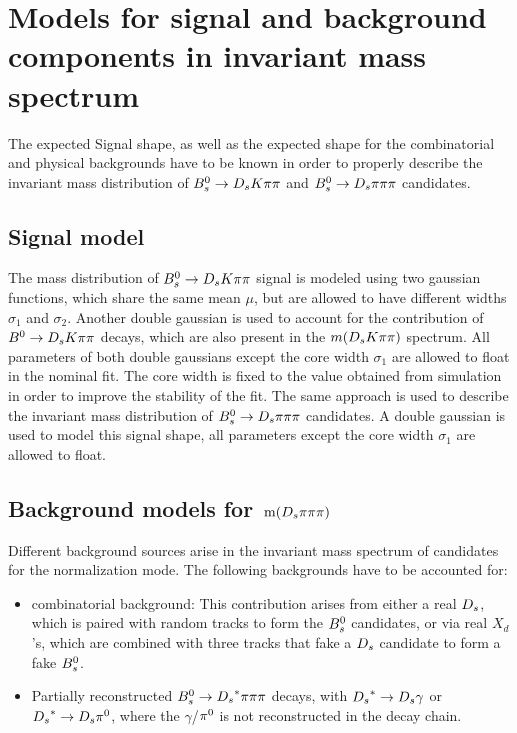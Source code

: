 \section{Models for signal and background components in invariant mass spectrum}
\label{sec: model}

The expected Signal shape, as well as the expected shape for the combinatorial and physical backgrounds have to be known in order to properly describe the invariant mass distribution of 
${{B}^0_{s}}\rightarrow{\ensuremath{{D}_{s}}}{\ensuremath{K}}{\ensuremath{\pi}}{\ensuremath{\pi}}$ and ${{B}^0_{s}}\rightarrow{\ensuremath{{D}_{s}}}{\ensuremath{\pi}}{\ensuremath{\pi}}{\ensuremath{\pi}}$ candidates.

\subsection{Signal model}
\label{subsec: signalmodel}
The mass distribution of ${{B}^0_{s}}\rightarrow{\ensuremath{{D}_{s}}}{\ensuremath{K}}{\ensuremath{\pi}}{\ensuremath{\pi}}$ signal is modeled using two gaussian functions, which share the same mean $\mu$, but are allowed to have different widths $\sigma_{1}$ and $\sigma_{2}$. 
Another double gaussian is used to account for the contribution of ${B}^{0}\rightarrow{\ensuremath{{D}_{s}}}{\ensuremath{K}}{\ensuremath{\pi}}{\ensuremath{\pi}}$ decays, which are also present in the $m({{D}_{s}}{K}{\pi}{\pi})$ spectrum. 
All parameters of both double gaussians except the core width $\sigma_{1}$ are allowed to float in the nominal fit. 
The core width is fixed to the value obtained from simulation in order to improve the stability of the fit. \newline
The same approach is used to describe the invariant mass distribution of ${{B}^0_{s}}\rightarrow{\ensuremath{{D}_{s}}}{\ensuremath{\pi}}{\ensuremath{\pi}}{\ensuremath{\pi}}$ candidates. 
A double gaussian is used to model this signal shape, all parameters except the core width $\sigma_{1}$ are allowed to float.

\subsection{Background models for $\mathrm{ \,m}({{D}_{s}}{\pi}{\pi}{\pi})$} 
\label{subsec: BkginNorm}
Different background sources arise in the invariant mass spectrum of candidates for the normalization mode. \newline
The following backgrounds have to be accounted for:
\begin{itemize}

\item combinatorial background: This contribution arises from either a real ${{D}_{s}}$, which is paired with random tracks to form the ${{B}^0_{s}}$ candidates, or via real $X_{d}$'s, which are combined with three tracks that fake a ${{D}_{s}}$ candidate to form a fake ${{B}^0_{s}}$.   

\item Partially reconstructed ${{B}^0_{s}}\rightarrow{\ensuremath{{D}_{s}}}^{*}{\pi}{\pi}{\pi}$ decays, with ${{D}_{s}}^{*}\rightarrow{\ensuremath{{D}_{s}}}\gamma$ or ${{D}_{s}}^{*}\rightarrow{\ensuremath{{D}_{s}}}{\ensuremath{{\pi}^0}}$, where the $\gamma$/${{\pi}^0}$ is not reconstructed in the decay chain. 

\end{itemize}

